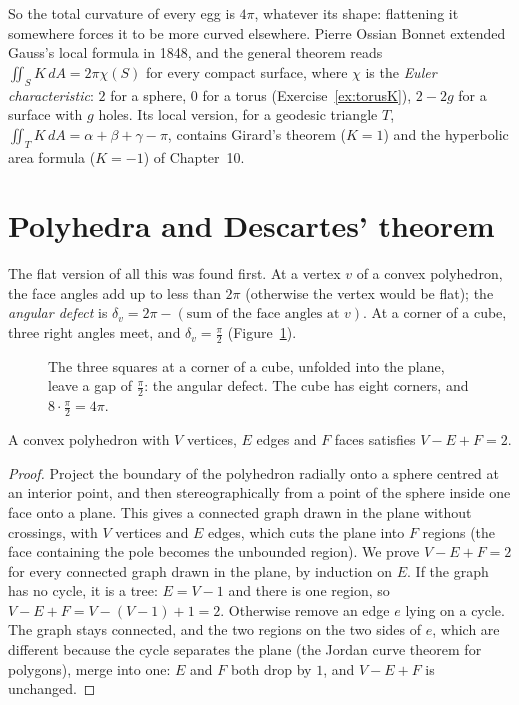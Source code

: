 So the total curvature of every egg is $4\pi$, whatever its shape: flattening it somewhere forces it to be more curved elsewhere. Pierre Ossian Bonnet extended Gauss's
local formula in 1848, and the general theorem reads $\iint_SK\,dA=2\pi\chi(S)$ for every compact surface, where $\chi$ is the \emph{Euler characteristic}: $2$ for a sphere,
$0$ for a torus (Exercise~\ref{ex:torusK}), $2-2g$ for a surface with $g$ holes. Its local version, for a geodesic triangle $T$,
$\iint_TK\,dA=\alpha+\beta+\gamma-\pi$, contains Girard's theorem ($K=1$) and the hyperbolic area formula ($K=-1$) of Chapter~10.

\section{Polyhedra and Descartes' theorem}

The flat version of all this was found first. At a vertex $v$ of a convex polyhedron, the face angles add up to less than $2\pi$ (otherwise the vertex would be
flat); the \emph{angular defect} is $\delta_v=2\pi-(\text{sum of the face angles at }v)$. At a corner of a cube, three right angles meet, and $\delta_v=\frac\pi2$
(Figure~\ref{fig:defect}).

\begin{figure}[ht]
\centering
{}
\caption{The three squares at a corner of a cube, unfolded into the plane, leave a gap of $\frac\pi2$: the angular defect. The cube has eight corners, and
$8\cdot\frac\pi2=4\pi$.}
\label{fig:defect}
\end{figure}

\begin{theorem}[Euler, 1758]\label{thm:euler}
A convex polyhedron with $V$ vertices, $E$ edges and $F$ faces satisfies $V-E+F=2$.
\end{theorem}

\begin{proof}
Project the boundary of the polyhedron radially onto a sphere centred at an interior point, and then stereographically from a point of the sphere inside one face
onto a plane. This gives a connected graph drawn in the plane without crossings, with $V$ vertices and $E$ edges, which cuts the plane into $F$ regions (the face
containing the pole becomes the unbounded region). We prove $V-E+F=2$ for every connected graph drawn in the plane, by induction on $E$. If the graph has no
cycle, it is a tree: $E=V-1$ and there is one region, so $V-E+F=V-(V-1)+1=2$. Otherwise remove an edge $e$ lying on a cycle. The graph stays connected, and the two
regions on the two sides of $e$, which are different because the cycle separates the plane (the Jordan curve theorem for polygons), merge into one: $E$ and $F$
both drop by $1$, and $V-E+F$ is unchanged.
\end{proof}

